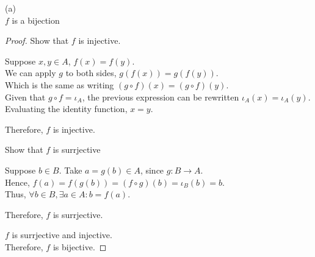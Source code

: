 \documentclass[a4paper, 11pt]{report}
\begin{document}
\newpage
{}
\sol (a) \\
\Propo $f$ is a bijection
\begin{proof}
  Show that $f$ is injective.
  \begin{list}{}{\setlength{\leftmargin}{1in}\setlength{\topsep}{0pt}}\item 
    Suppose $x,y\in A$, $f(x)=f(y)$. \\
    We can apply $g$ to both sides, $g(f(x)) = g(f(y))$. \\
    Which is the same as writing $(g\circ f)(x) = (g\circ f)(y)$. \\
    Given that $g\circ f=\iota_A$, the previous expression can be rewritten $\iota_A(x)=\iota_A(y)$. \\
    Evaluating the identity function, $x = y$.

    Therefore, $f$ is injective.
  \end{list}

  Show that $f$ is surrjective
  \begin{list}{}{\setlength{\leftmargin}{1in}\setlength{\topsep}{0pt}}\item 
    Suppose $b\in B$. Take $a=g(b)\in A$, since $g:B\to A$. \\
    Hence, $f(a)=f(g(b)) = (f\circ g)(b) = \iota_B(b) = b$. \\
    Thus, $\forall b\in B, \exists a\in A: b=f(a)$.

    Therefore, $f$ is surrjective. \\
  \end{list}
  
  $f$ is surrjective and injective. \\
  Therefore, $f$ is bijective.
\end{proof}
\end{document}
